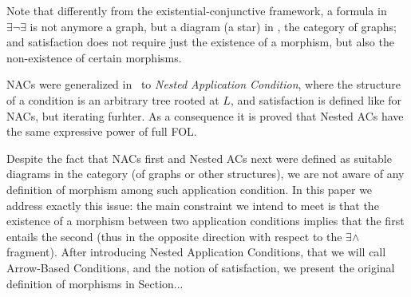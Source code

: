  Note that differently from the existential-conjunctive framework, a formula in $\exists \neg \exists$ is not anymore a graph, but a diagram (a star) in , the category of graphs; and satisfaction does not require just the existence of a morphism, but also the non-existence of certain morphisms.

 NACs were generalized in~\cite{Rensink-FOL,Habel-FOL} to \emph{Nested Application Condition}, where the structure of a condition is an arbitrary tree rooted at $L$, and satisfaction is defined like for NACs, but iterating furhter. As a consequence it is proved that Nested ACs have the same expressive power of full FOL.

 Despite the fact that NACs first and Nested ACs next were defined as suitable diagrams in the category (of graphs or other structures), we are not aware of any definition of morphism among such application condition. In this paper we address exactly this issue: the main constraint we intend to meet is that the existence of a morphism between two application conditions implies that the first entails the second (thus in the opposite direction with respect to the $\exists\wedge$ fragment). After introducing Nested Application Conditions, that we will call Arrow-Based Conditions, and the notion of satisfaction, we present the original definition of morphisms in Section... 
 
 